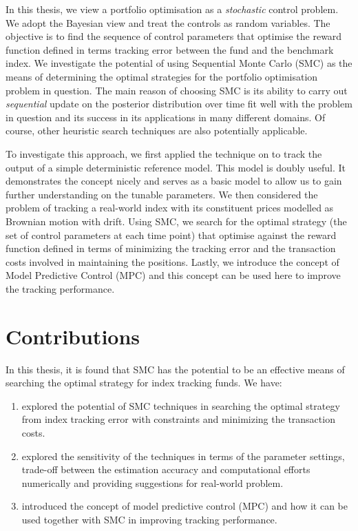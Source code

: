 In this thesis, we view a portfolio optimisation as a \emph{stochastic} control problem. We adopt the Bayesian view and treat the controls as random variables. The objective is to find the sequence of control parameters that optimise the reward function defined in terms tracking error between the fund and the benchmark index. We investigate the potential of using Sequential Monte Carlo (SMC) as the means of determining the optimal strategies for the portfolio optimisation problem in question. The main reason of choosing SMC is its ability to carry out \emph{sequential} update on the posterior distribution over time fit well with the problem in question and its success in its applications in many different domains. Of course, other heuristic search techniques are also potentially applicable.

To investigate this approach, we first applied the technique on to track the output of a simple deterministic reference model. This model is doubly useful. It demonstrates the concept nicely and serves as a basic model to allow us to gain further understanding on the tunable parameters. We then considered the problem of tracking a real-world index with its constituent prices modelled as Brownian motion with drift. Using SMC, we search for the optimal strategy (the set of control parameters at each time point) that optimise against the reward function defined in terms of minimizing the tracking error and the transaction costs involved in maintaining the positions. Lastly, we introduce the concept of Model Predictive Control (MPC) and this concept can be used here to improve the tracking performance.

\section{Contributions}
In this thesis, it is found that SMC has the potential to be an effective means of searching the optimal strategy for index tracking funds. We have:
\begin{enumerate}
\item explored the potential of SMC techniques in searching the optimal strategy from index tracking error with constraints and minimizing the transaction costs.
\item explored the sensitivity of the techniques in terms of the parameter settings, trade-off between the estimation accuracy and computational efforts numerically and providing suggestions for real-world problem.
\item introduced the concept of model predictive control (MPC) and how it can be used together with SMC in improving tracking performance.
\end{enumerate}

